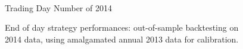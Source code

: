 \begin{figure}
\centering
\begin{subfigure}{.45\linewidth}
  \centering
  \setlength\figureheight{\linewidth} 
  \setlength\figurewidth{\linewidth}
  
\end{subfigure}%
\hfill%
\begin{subfigure}{.45\linewidth}
  \centering
  \setlength\figureheight{\linewidth} 
  \setlength\figurewidth{\linewidth}
   
\end{subfigure}\\

\leavevmode{}\hspace{0pt plus 1filll}\null

Trading Day Number of 2014

\vspace{1cm}
\begin{subfigure}{\linewidth}
  \setlength\figureheight{\linewidth} 
  \setlength\figurewidth{\linewidth}
  \resizebox{\linewidth}{!}{}
\end{subfigure}%
  \caption{End of day strategy performances: out-of-sample backtesting on 2014 data, using amalgamated annual 2013 data for calibration.}
  \label{fig:OOS_annual_comp}
\end{figure}

